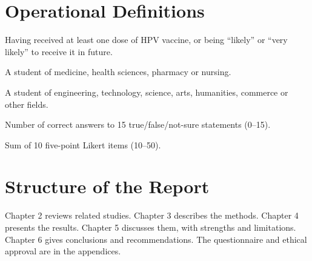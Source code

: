 \section{Operational Definitions}
\begin{description}[leftmargin=0pt,style=nextline,itemsep=2pt]
\item[Acceptance] Having received at least one dose of HPV vaccine, or being ``likely'' or ``very likely'' to receive it in future.
\item[Healthcare student] A student of medicine, health sciences, pharmacy or nursing.
\item[Non-healthcare student] A student of engineering, technology, science, arts, humanities, commerce or other fields.
\item[Knowledge score] Number of correct answers to 15 true/false/not-sure statements (0--15).
\item[Attitude score] Sum of 10 five-point Likert items (10--50).
\end{description}

\section{Structure of the Report}
Chapter 2 reviews related studies. Chapter 3 describes the methods. Chapter 4 presents the results. Chapter 5 discusses them, with strengths and limitations. Chapter 6 gives conclusions and recommendations. The questionnaire and ethical approval are in the appendices.
